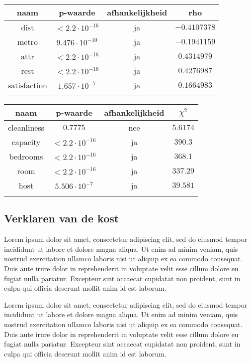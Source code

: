 \documentclass[a4paper]{kulakarticle}
\begin{document}
	
	\begin{tabular}{c|c|c|c }
		 naam & p-waarde & afhankelijkheid & rho\\
		 \hline
		 \hline
		 dist & $< 2.2 \cdot 10^{-16} $&ja& $-0.4107378$ \\
		 metro &$ 9.476\cdot 10^{-10}$& ja& $-0.1941159$ \\ 
		 attr &$ < 2.2\cdot 10^{-16}$& ja&$0.4314979 $ \\
		 rest &$ < 2.2\cdot 10^{-16}$& ja&$0.4276987 $ \\
		 satisfaction &$ 1.657\cdot 10^{-7}$& ja&$0.1664983 $ \\
		 
		 \label{continue variabelen afhankelijkheid}
		 
	\end{tabular}

\begin{tabular}{c|c|c|c }
	naam & p-waarde & afhankelijkheid & $\chi ^2$\\
	\hline
	\hline
	cleanliness & $0.7775$&nee& $5.6174$ \\
	capacity &$ < 2.2\cdot 10^{-16}$& ja& $390.3$ \\ 
	bedrooms &$ < 2.2\cdot 10^{-16}$& ja&$368.1 $ \\
	room &$ < 2.2\cdot 10^{-16}$& ja&$ 337.29$ \\
	host &$ 5.506\cdot 10^{-7}$& ja&$39.581 $ \\
	\label{discrete variabelen afhankelijkheid}
\end{tabular}


	
	\subsection{Verklaren van de kost}
	Lorem ipsum dolor sit amet, consectetur adipiscing elit, sed do eiusmod tempor incididunt ut labore et dolore magna aliqua. Ut enim ad minim veniam, quis nostrud exercitation ullamco laboris nisi ut aliquip ex ea commodo consequat. Duis aute irure dolor in reprehenderit in voluptate velit esse cillum dolore eu fugiat nulla pariatur. Excepteur sint occaecat cupidatat non proident, sunt in culpa qui officia deserunt mollit anim id est laborum.
	
	Lorem ipsum dolor sit amet, consectetur adipiscing elit, sed do eiusmod tempor incididunt ut labore et dolore magna aliqua. Ut enim ad minim veniam, quis nostrud exercitation ullamco laboris nisi ut aliquip ex ea commodo consequat. Duis aute irure dolor in reprehenderit in voluptate velit esse cillum dolore eu fugiat nulla pariatur. Excepteur sint occaecat cupidatat non proident, sunt in culpa qui officia deserunt mollit anim id est laborum.
	
\end{document}
